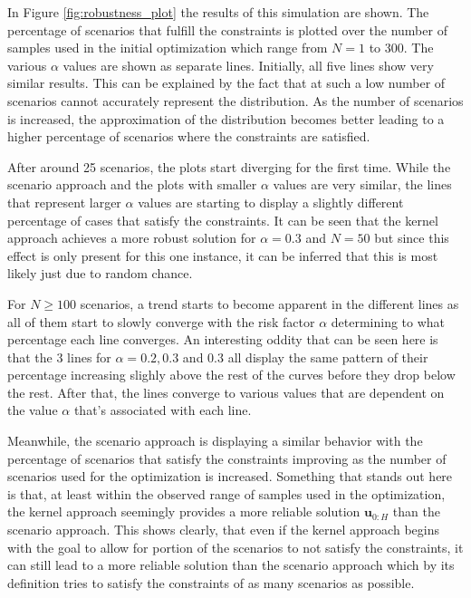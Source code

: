 In Figure \ref{fig:robustness_plot} the results of this simulation are shown. The percentage of scenarios that fulfill the constraints is plotted over the number of samples used in the initial optimization which range from $N = 1$ to 300. The various $\alpha$ values are shown as separate lines. Initially, all five lines show very similar results. This can be explained by the fact that at such a low number of scenarios cannot accurately represent the distribution. As the number of scenarios is increased, the approximation of the distribution becomes better leading to a higher percentage of scenarios where the constraints are satisfied.

After around 25 scenarios, the plots start diverging for the first time. While the scenario approach and the plots with smaller $\alpha$ values are very similar, the lines that represent larger $\alpha$ values are starting to display a slightly different percentage of cases that satisfy the constraints. It can be seen that the kernel approach achieves a more robust solution for $\alpha = 0.3$ and $N = 50$ but since this effect is only present for this one instance, it can be inferred that this is most likely just due to random chance.

For $N \geq 100$ scenarios, a trend starts to become apparent in the different lines as all of them start to slowly converge with the risk factor $\alpha$ determining to what percentage each line converges. An interesting oddity that can be seen here is that the 3 lines for $\alpha = 0.2, 0.3$ and $0.3$ all display the same pattern of their percentage increasing slighly above the rest of the curves before they drop below the rest. After that, the lines converge to various values that are dependent on the value $\alpha$ that's associated with each line.

Meanwhile, the scenario approach is displaying a similar behavior with the percentage of scenarios that satisfy the constraints improving as the number of scenarios used for the optimization is increased. Something that stands out here is that, at least within the observed range of samples used in the optimization, the kernel approach seemingly provides a more reliable solution $\boldsymbol{u}_{0:H}$ than the scenario approach. This shows clearly, that even if the kernel approach begins with the goal to allow for portion of the scenarios to not satisfy the constraints, it can still lead to a more reliable solution than the scenario approach which by its definition tries to satisfy the constraints of as many scenarios as possible.


